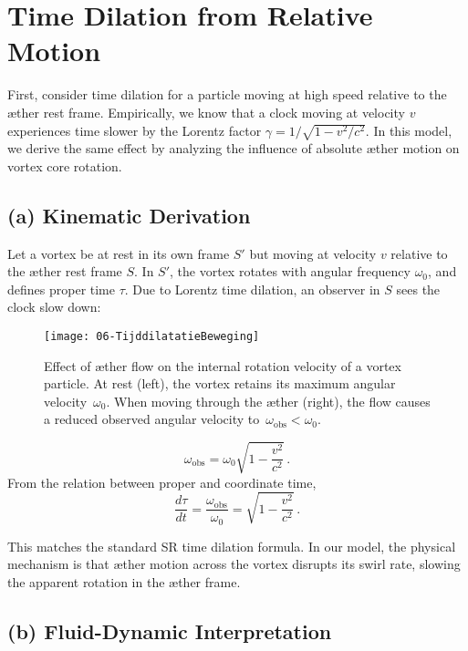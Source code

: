 \section{Time Dilation from Relative Motion}

First, consider time dilation for a particle moving at high speed relative to the æther rest frame. Empirically, we know that a clock moving at velocity $v$ experiences time slower by the Lorentz factor $\gamma = 1/\sqrt{1 - v^2/c^2}$. In this model, we derive the same effect by analyzing the influence of absolute æther motion on vortex core rotation.

\subsection*{(a) Kinematic Derivation}

Let a vortex be at rest in its own frame $S'$ but moving at velocity $v$ relative to the æther rest frame $S$. In $S'$, the vortex rotates with angular frequency $\omega_0$, and defines proper time $\tau$. Due to Lorentz time dilation, an observer in $S$ sees the clock slow down:

\begin{figure}[htbp]
    \centering
    \texttt{[image: 06-TijddilatatieBeweging]}
    \caption{Effect of æther flow on the internal rotation velocity of a vortex particle. At rest (left), the vortex retains its maximum angular velocity~$\omega_0$. When moving through the æther (right), the flow causes a reduced observed angular velocity to~$\omega_{\mathrm{obs}} < \omega_0$.}
    \label{fig:TijddilatatieBeweging}
\end{figure}

\[
\omega_\text{obs} = \omega_0 \sqrt{1 - \frac{v^2}{c^2}} \,.
\]
From the relation between proper and coordinate time,
\begin{equation}
\frac{d\tau}{dt} = \frac{\omega_\text{obs}}{\omega_0} = \sqrt{1 - \frac{v^2}{c^2}} \,.
\end{equation}

This matches the standard SR time dilation formula. In our model, the physical mechanism is that æther motion across the vortex disrupts its swirl rate, slowing the apparent rotation in the æther frame.

\subsection*{(b) Fluid-Dynamic Interpretation}

